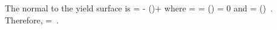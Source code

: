   The normal to the yield surface is
  \Beq
    \BN =  - \Third \Tr\left(\right)\BI +
           \BI 
  \Eeq
  where
  \Beq
     =  \Partial{\sigma^\xi_\Teff}{\Bxi}
      =   \frac{\Bxi}{\Norm{\Bxi}{}}
    \quad \implies \quad
    \Tr\left(\right) = 0 
  \Eeq
  and
  \Beq
     = 
      \exp \left(\right) \,.
  \Eeq
  Therefore,
  \Beq
    \BN =  \,.
  \Eeq


